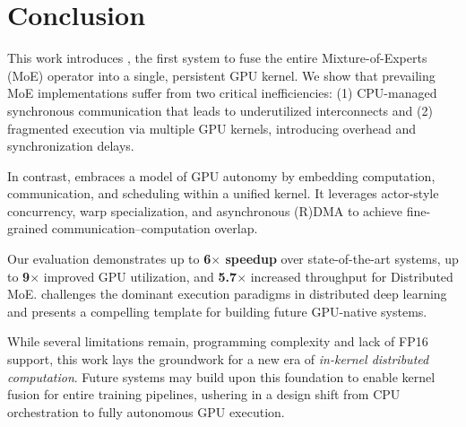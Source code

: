 \section{Conclusion}\label{sec:conclusion-and-future-work}
This work introduces \sysname,
the first system to fuse the entire Mixture-of-Experts (MoE)
operator into a single, persistent GPU kernel.
We show that prevailing MoE implementations
suffer from two critical inefficiencies:
(1) CPU-managed synchronous communication that leads to underutilized
interconnects and (2) fragmented execution via multiple GPU kernels,
introducing overhead and synchronization delays.

In contrast, \sysname embraces a model of
GPU autonomy by embedding computation, communication, and scheduling within a unified kernel.
It leverages actor-style concurrency,
warp specialization, and asynchronous (R)DMA to
achieve fine-grained communication–computation overlap.

Our evaluation demonstrates up to \textbf{6$\times$ speedup}
over state-of-the-art systems, up to \textbf{9$\times$} improved GPU utilization, and
\textbf{5.7$\times$} increased throughput for Distributed MoE\@.
\sysname challenges the dominant execution paradigms in distributed deep learning
and presents a compelling template for building future GPU-native systems.

While several limitations remain, programming complexity and lack of FP16 support, this
work lays the groundwork for a new era of \emph{in-kernel distributed computation}.
Future systems may build upon this foundation to enable kernel fusion for
entire training pipelines, ushering in a design shift from CPU orchestration to
fully autonomous GPU execution.
